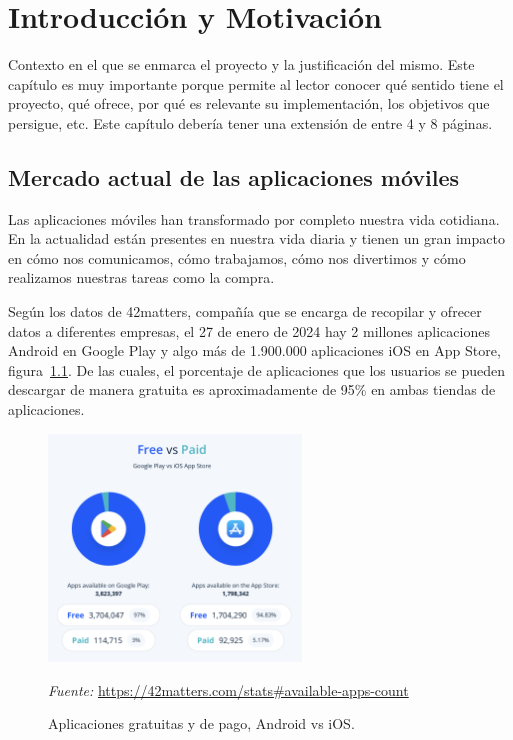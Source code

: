 \cleardoublepage
\chapter{Introducción y Motivación}
\label{sec:intro} %

Contexto en el que se enmarca el proyecto y la justificación del mismo. Este capítulo es muy importante porque permite al lector conocer qué sentido tiene el proyecto, qué ofrece, por qué es relevante su implementación, los objetivos que persigue, etc. Este capítulo debería tener una extensión de entre 4 y 8 páginas.

\section{Mercado actual de las aplicaciones móviles}

Las aplicaciones móviles han transformado por completo nuestra vida cotidiana. En la actualidad están presentes en nuestra vida diaria y tienen un gran impacto en cómo nos comunicamos, cómo trabajamos, cómo nos divertimos y cómo realizamos nuestras tareas como la compra.

Según los datos de 42matters, compañía que se encarga de recopilar y ofrecer datos a diferentes empresas, el 27 de enero de 2024 hay 2 millones aplicaciones Android en Google Play y algo más de 1.900.000 aplicaciones iOS en App Store, figura~\ref{fig:apps_free_vs_pay}. De las cuales, el porcentaje de aplicaciones que los usuarios se pueden descargar de manera gratuita es aproximadamente de 95\% en ambas tiendas de aplicaciones.

\begin{figure}[H]
\centering
\includegraphics[width=0.6\textwidth]{./img/intro/apps_free_vs_pay.png}
\caption{Aplicaciones gratuitas y de pago, Android vs iOS.}
\label{fig:apps_free_vs_pay}
\vspace{0.2em}
{\footnotesize \centering \textit{Fuente:} \url{https://42matters.com/stats#available-apps-count} \par}
\end{figure}

